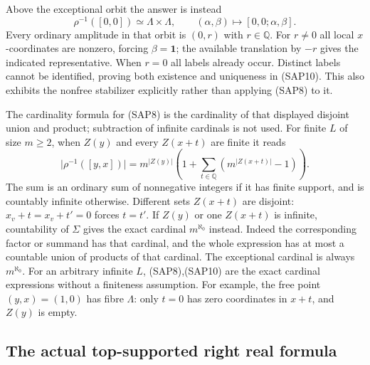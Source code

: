 Above the exceptional orbit the answer is instead
\begin{equation}\tag{SAP10}
\rho^{-1}([0,0])\simeq\Lambda\times\Lambda,
\qquad(\alpha,\beta)\longmapsto[0,0;\alpha,\beta].
\end{equation}
Every ordinary amplitude in that orbit is $(0,r)$ with
$r\in\mathbb Q$. For $r\ne0$ all local $x$-coordinates are
nonzero, forcing $\beta=\boldsymbol1$; the available translation
by $-r$ gives the indicated representative. When $r=0$ all
labels already occur. Distinct labels cannot be identified, proving
both existence and uniqueness in (SAP10). This also exhibits the
nonfree stabilizer explicitly rather than applying (SAP8) to it.

The cardinality formula for (SAP8) is the cardinality of that
displayed disjoint union and product; subtraction of infinite
cardinals is not used. For finite $L$ of size $m\ge2$, when
$Z(y)$ and every $Z(x+t)$ are finite it reads
\begin{equation}\tag{SAP11}
\bigl|\rho^{-1}([y,x])\bigr|
 =m^{|Z(y)|}\left(1+\sum_{t\in\mathbb Q}
                      (m^{|Z(x+t)|}-1)\right).
\end{equation}
The sum is an ordinary sum of nonnegative integers if it has
finite support, and is countably infinite otherwise. Different
sets $Z(x+t)$ are disjoint: $x_v+t=x_v+t'=0$ forces $t=t'$.
If $Z(y)$ or one $Z(x+t)$ is infinite, countability of $\Sigma$
gives the exact cardinal $m^{\aleph_0}$ instead. Indeed the
corresponding factor or summand has that cardinal, and the whole
expression has at most a countable union of products of that
cardinal. The exceptional cardinal is always $m^{\aleph_0}$.
For an arbitrary infinite $L$, (SAP8),(SAP10) are the exact
cardinal expressions without a finiteness assumption. For example,
the free point $(y,x)=(1,0)$ has fibre $\Lambda$: only $t=0$
has zero coordinates in $x+t$, and $Z(y)$ is empty.

\subsection{The actual top-supported right real formula}

